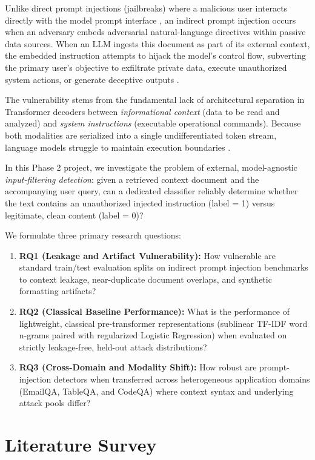 \documentclass[10pt,conference]{IEEEtran}
\begin{document}
Unlike direct prompt injections (jailbreaks) where a malicious user interacts directly with the model prompt interface \cite{perez2022prompt}, an indirect prompt injection occurs when an adversary embeds adversarial natural-language directives within passive data sources. When an LLM ingests this document as part of its external context, the embedded instruction attempts to hijack the model's control flow, subverting the primary user's objective to exfiltrate private data, execute unauthorized system actions, or generate deceptive outputs \cite{greshake2023not,yi2025bipia}.

The vulnerability stems from the fundamental lack of architectural separation in Transformer decoders between \textit{informational context} (data to be read and analyzed) and \textit{system instructions} (executable operational commands). Because both modalities are serialized into a single undifferentiated token stream, language models struggle to maintain execution boundaries \cite{yi2025bipia,liu2024formalizing}.

In this Phase 2 project, we investigate the problem of external, model-agnostic \textit{input-filtering detection}: given a retrieved context document and the accompanying user query, can a dedicated classifier reliably determine whether the text contains an unauthorized injected instruction (label = 1) versus legitimate, clean content (label = 0)? 

We formulate three primary research questions:
\begin{enumerate}
    \item \textbf{RQ1 (Leakage and Artifact Vulnerability):} How vulnerable are standard train/test evaluation splits on indirect prompt injection benchmarks to context leakage, near-duplicate document overlaps, and synthetic formatting artifacts?
    \item \textbf{RQ2 (Classical Baseline Performance):} What is the performance of lightweight, classical pre-transformer representations (sublinear TF-IDF word n-grams paired with regularized Logistic Regression) when evaluated on strictly leakage-free, held-out attack distributions?
    \item \textbf{RQ3 (Cross-Domain and Modality Shift):} How robust are prompt-injection detectors when transferred across heterogeneous application domains (EmailQA, TableQA, and CodeQA) where context syntax and underlying attack pools differ?
\end{enumerate}

\section{Literature Survey}
\end{document}

